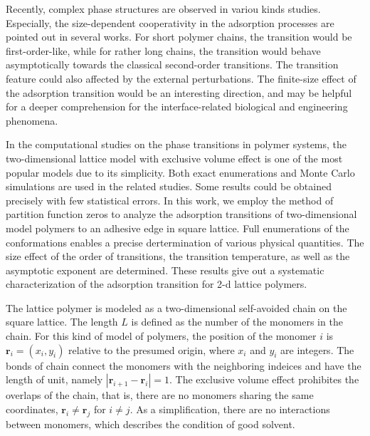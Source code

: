 \documentclass[preprint,preprintnumbers,amsmath,amssymb,showpacs,aps,pre]{revtex4-1}
\begin{document}
Recently, complex phase structures are observed in variou kinds studies.
Especially, the size-dependent cooperativity in the adsorption processes
are pointed out in several works. For short polymer chains, the transition
would be first-order-like, while for rather long chains, the transition
would behave asymptotically towards the classical second-order transitions.
The transition feature could also affected by the external perturbations.
The finite-size effect of the adsorption transition would be an interesting
direction, and may be helpful for a deeper comprehension for the
interface-related biological and engineering phenomena. 


In the computational studies on the phase transitions in polymer
systems, the two-dimensional lattice model with exclusive volume effect is
one of the most popular models due to its simplicity. Both exact
enumerations and Monte Carlo simulations are used in the related
studies\cite{SaleurJSP86,DuplantierPRL87,StanleyPRB89,OYJCP08,
DerridaJPA85,SenoJP88,ChangPRE93,HeegerJP95,MurthyPRE01}. Some 
results could be obtained precisely with few statistical errors.
In this work, we employ the method of partition function zeros
to analyze the adsorption transitions of two-dimensional  model
polymers to an adhesive edge in square lattice. Full enumerations
of the conformations enables a precise dertermination of various
physical quantities. The size effect of the order of transitions,
the transition temperature, as well as the asymptotic exponent are
determined. These results give out a systematic characterization
of the adsorption transition for 2-d lattice polymers.



The lattice polymer is modeled as a two-dimensional self-avoided chain
on the square lattice. The length $L$ is defined as the number of the
monomers in the chain. For this kind of model of polymers, the position
of the monomer $i$ is ${\mathbf r}_i=(x_i,y_i)$ relative to the presumed
origin, where $x_i$ and $y_i$ are integers. The bonds of chain connect
the monomers with the neighboring indeices and have the length of unit,
namely $|{\mathbf r}_{i+1}-{\mathbf r}_i|=1$. The exclusive volume effect
prohibites the overlaps of the chain, that is, there are no monomers sharing
the same coordinates, ${\mathbf r}_i\neq {\mathbf r}_j$ for $i\neq j$. 
As a simplification, there are no interactions between monomers, which
describes the condition of good solvent.
\end{document}
